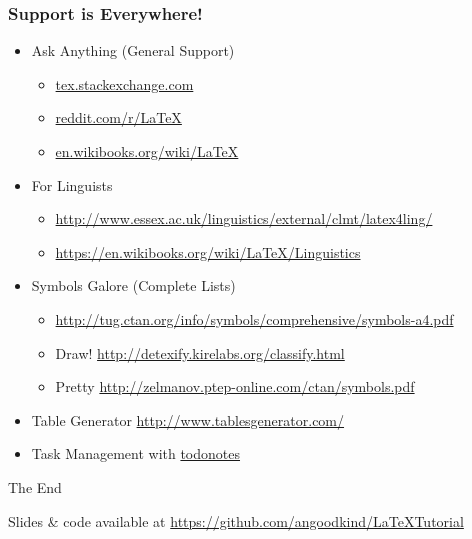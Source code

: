\documentclass[xcolor={svgnames},
hyperref={colorlinks,citecolor=DeepPink4,linkcolor=DarkRed,urlcolor=DarkBlue}
]{beamer}
\begin{document}
	\begin{frame}
		\frametitle{Support is Everywhere!}
		\begin{itemize}
			\item Ask Anything (General Support)
			\begin{itemize}
				\item \url{tex.stackexchange.com}
				\item \url{reddit.com/r/LaTeX}
				\item \url{en.wikibooks.org/wiki/LaTeX}
			\end{itemize}
			\item For Linguists
			\begin{itemize}
				\item \tiny{\url{http://www.essex.ac.uk/linguistics/external/clmt/latex4ling/}}
				\item \tiny{\url{https://en.wikibooks.org/wiki/LaTeX/Linguistics}}
			\end{itemize}
			\item Symbols Galore (Complete Lists)
			\begin{itemize}
				\item \tiny{\url{http://tug.ctan.org/info/symbols/comprehensive/symbols-a4.pdf}}
				\item Draw! \tiny{\url{http://detexify.kirelabs.org/classify.html}}
				\item Pretty \tiny{\url{http://zelmanov.ptep-online.com/ctan/symbols.pdf}}
			\end{itemize}
			\item Table Generator \url{http://www.tablesgenerator.com/}
			\item Task Management with \href{http://mirrors.ibiblio.org/CTAN/macros/latex/contrib/todonotes/todonotes.pdf}{todonotes}
		\end{itemize}
	\end{frame}
	
	\begin{frame}
		\Huge{\centerline{The End}}
		\vfill
		\begin{center}
			\footnotesize{Slides \& code available at}
			\footnotesize{\url{https://github.com/angoodkind/LaTeXTutorial}}
		\end{center}
	\end{frame}
	
	
\end{document}
